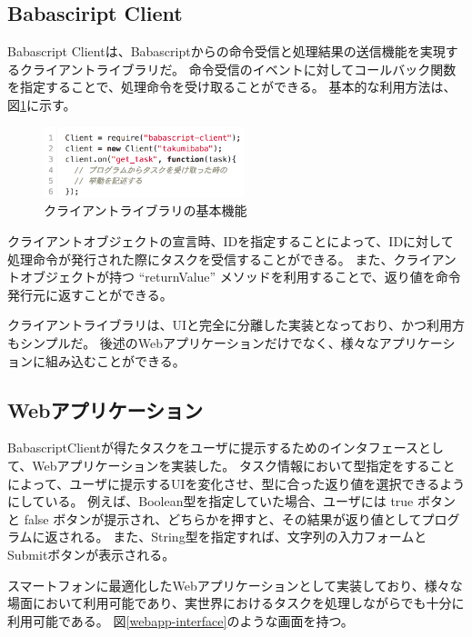 \subsection{Babasciript Client}\label{babasciript-client}

Babascript
Clientは、Babascriptからの命令受信と処理結果の送信機能を実現するクライアントライブラリだ。
命令受信のイベントに対してコールバック関数を指定することで、処理命令を受け取ることができる。
基本的な利用方法は、図\ref{client}に示す。

\begin{figure}[h]
  \centering
  \includegraphics[width=220px]{./images/client.png}
  \caption{クライアントライブラリの基本機能 }
  \label{client}
\end{figure}

クライアントオブジェクトの宣言時、IDを指定することによって、IDに対して処理命令が発行された際にタスクを受信することができる。
また、クライアントオブジェクトが持つ ``returnValue''
メソッドを利用することで、返り値を命令発行元に返すことができる。

クライアントライブラリは、UIと完全に分離した実装となっており、かつ利用方もシンプルだ。
後述のWebアプリケーションだけでなく、様々なアプリケーションに組み込むことができる。

\subsection{Webアプリケーション}\label{webux30a2ux30d7ux30eaux30b1ux30fcux30b7ux30e7ux30f3}

BabascriptClientが得たタスクをユーザに提示するためのインタフェースとして、Webアプリケーションを実装した。
タスク情報において型指定をすることによって、ユーザに提示するUIを変化させ、型に合った返り値を選択できるようにしている。
例えば、Boolean型を指定していた場合、ユーザには true ボタンと false
ボタンが提示され、どちらかを押すと、その結果が返り値としてプログラムに返される。
また、String型を指定すれば、文字列の入力フォームとSubmitボタンが表示される。

スマートフォンに最適化したWebアプリケーションとして実装しており、様々な場面において利用可能であり、実世界におけるタスクを処理しながらでも十分に利用可能である。
図\ref{webapp-interface}のような画面を持つ。

